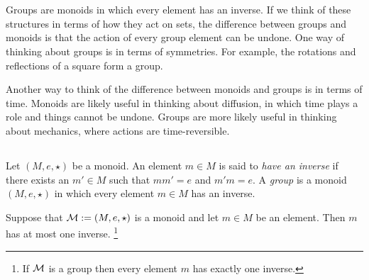 \documentclass[../main/CT4S-EN-RU]{subfiles}
\begin{document}
\section{}\label{sec:groups}

\begin{blockENG}
Groups are monoids in which every element has an inverse. If we think of these structures in terms of how they act on sets, the difference between groups and monoids is that the action of every group element can be undone. One way of thinking about groups is in terms of symmetries. For example, the rotations and reflections of a square form a group. 
\end{blockENG}

\begin{blockRUS}
\end{blockRUS}

\begin{blockENG}
Another way to think of the difference between monoids and groups is in terms of time. Monoids are likely useful in thinking about diffusion, in which time plays a role and things cannot be undone. Groups are more likely useful in thinking about mechanics, where actions are time-reversible. 
\end{blockENG}

\begin{blockRUS}
\end{blockRUS}


\subsection{}

\begin{definitionENG}\label{def:group}
Let $(M,e,\star)$ be a monoid. An element $m\in M$ is said to {\em have an inverse} if there exists an $m'\in M$ such that $mm'=e$ and $m'm=e.$ A {\em group} is a monoid $(M,e,\star)$ in which every element $m\in M$ has an inverse.
\end{definitionENG}

\begin{definitionRUS}\label{def:group}
\end{definitionRUS}

\begin{propositionENG}
Suppose that $\mathcal{M}:=(M,e,\star)$ is a monoid and let $m\in M$ be an element. Then $m$ has at most one inverse.
\footnote{If $\mathcal{M}$ is a group then every element $m$ has exactly one inverse.}
\end{propositionENG}
\end{document}

